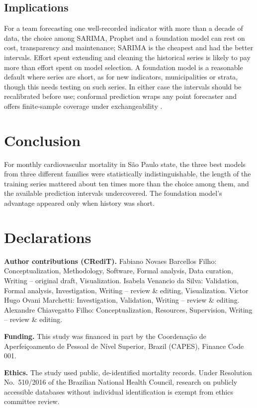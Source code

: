 \subsection{Implications}

For a team forecasting one well-recorded indicator with more than a decade of data, the
choice among SARIMA, Prophet and a foundation model can rest on cost, transparency and
maintenance; SARIMA is the cheapest and had the better intervals. Effort spent extending and
cleaning the historical series is likely to pay more than effort spent on model selection.
A foundation model is a reasonable default where series are short, as for new indicators,
municipalities or strata, though this needs testing on such series. In either case the
intervals should be recalibrated before use; conformal prediction wraps any point forecaster
and offers finite-sample coverage under exchangeability \citep{angelopoulos2023}.

\section{Conclusion}

For monthly cardiovascular mortality in S\~ao Paulo state, the three best models from three
different families were statistically indistinguishable, the length of the training series
mattered about ten times more than the choice among them, and the available prediction
intervals undercovered. The foundation model's advantage appeared only when history was
short.

\section*{Declarations}

\ifdefined\BLIND\else
\textbf{Author contributions (CRediT).} Fabiano Novaes Barcellos Filho: Conceptualization,
Methodology, Software, Formal analysis, Data curation, Writing -- original draft,
Visualization. Isabela Venancio da Silva: Validation, Formal analysis, Investigation,
Writing -- review \& editing, Visualization. Victor Hugo Ovani Marchetti: Investigation,
Validation, Writing -- review \& editing. Alexandre Chiavegatto Filho: Conceptualization,
Resources, Supervision, Writing -- review \& editing.

\textbf{Funding.} This study was financed in part by the Coordena\c{c}\~ao de
Aperfei\c{c}oamento de Pessoal de N\'ivel Superior, Brazil (CAPES), Finance Code 001.
\fi

\textbf{Ethics.} The study used public, de-identified mortality records. Under Resolution
No.~510/2016 of the Brazilian National Health Council, research on publicly accessible
databases without individual identification is exempt from ethics committee review.

